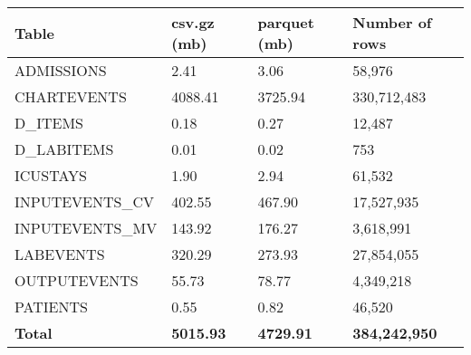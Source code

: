 \begin{tabular}{llll}
\toprule
Table & csv.gz (mb) & parquet (mb) & Number of rows \\
\midrule
ADMISSIONS & 2.41 & 3.06 & 58,976 \\
CHARTEVENTS & 4088.41 & 3725.94 & 330,712,483 \\
D\_ITEMS & 0.18 & 0.27 & 12,487 \\
D\_LABITEMS & 0.01 & 0.02 & 753 \\
ICUSTAYS & 1.90 & 2.94 & 61,532 \\
INPUTEVENTS\_CV & 402.55 & 467.90 & 17,527,935 \\
INPUTEVENTS\_MV & 143.92 & 176.27 & 3,618,991 \\
LABEVENTS & 320.29 & 273.93 & 27,854,055 \\
OUTPUTEVENTS & 55.73 & 78.77 & 4,349,218 \\
PATIENTS & 0.55 & 0.82 & 46,520 \\
\textbf{Total} & \textbf{5015.93} & \textbf{4729.91} & \textbf{384,242,950} \\
\bottomrule
\end{tabular}
